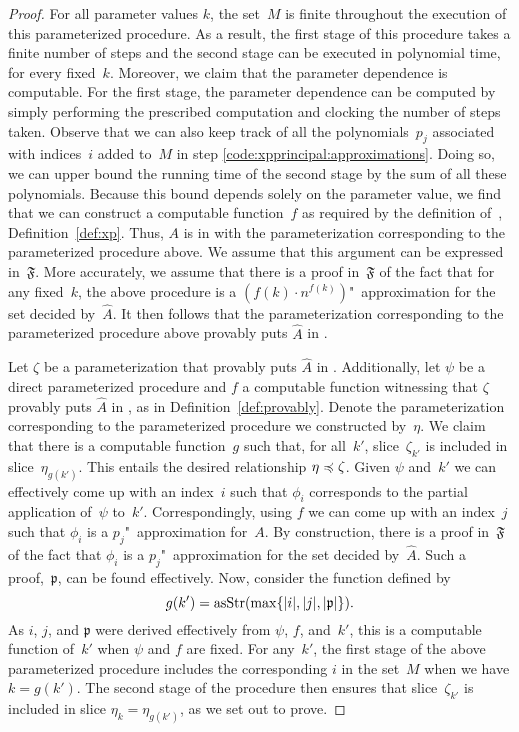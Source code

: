 \begin{proof}
  For all parameter values $k$, the set~$M$ is finite throughout the execution of this parameterized procedure.
  As a result, the first stage of this procedure takes a finite number of steps and the second stage can be executed in polynomial time, for every fixed~$k$.
  Moreover, we claim that the parameter dependence is computable.
  For the first stage, the parameter dependence can be computed by simply performing the prescribed computation and clocking the number of steps taken.
  Observe that we can also keep track of all the polynomials~$p_j$ associated with indices~$i$ added to~$M$ in step \ref{code:xpprincipal:approximations}.
  Doing so, we can upper bound the running time of the second stage by the sum of all these polynomials.
  Because this bound depends solely on the parameter value, we find that we can construct a computable function~$f$ as required by the definition of~, Definition~\ref{def:xp}.
  Thus, $A$ is in  with the parameterization corresponding to the parameterized procedure above.
  We assume that this argument can be expressed in~$\mathfrak{F}$.
  More accurately, we assume that there is a proof in~$\mathfrak{F}$ of the fact that for any fixed~$k$, the above procedure is a $(f(k) \cdot n^{f(k)})$"~approximation for the set decided by~$\hat{A}$.
  It then follows that the parameterization corresponding to the parameterized procedure above provably puts $\hat{A}$ in .

  Let $\zeta$ be a parameterization that provably puts $\hat{A}$ in .
  Additionally, let $\psi$ be a direct parameterized procedure and $f$ a computable function witnessing that $\zeta$ provably puts $\hat{A}$ in , as in Definition~\ref{def:provably}.
  Denote the parameterization corresponding to the parameterized procedure we constructed by~$\eta$.
  We claim that there is a computable function~$g$ such that, for all~$k'$, slice~$\zeta_{k'}$ is included in slice~$\eta_{g(k')}$.
  This entails the desired relationship $\eta \preccurlyeq \zeta$.
  Given $\psi$ and~$k'$ we can effectively come up with an index~$i$ such that $\phi_i$ corresponds to the partial application of~$\psi$ to~$k'$.
  Correspondingly, using $f$ we can come up with an index~$j$ such that $\phi_i$ is a $p_j$"~approximation for~$A$.
  By construction, there is a proof in~$\mathfrak{F}$ of the fact that $\phi_i$ is a $p_j$"~approximation for the set decided by~$\hat{A}$.
  Such a proof,~$\mathfrak{p}$, can be found effectively.
  Now, consider the function defined by
  \begin{equation*}
    g(k') = \operatorname{asStr}(\max\{{\lvert i\rvert}, {\lvert j\rvert}, {\lvert\mathfrak{p}\rvert}\}).
  \end{equation*}
  As $i$, $j$, and $\mathfrak{p}$ were derived effectively from $\psi$, $f$, and~$k'$, this is a computable function of~$k'$ when $\psi$ and $f$ are fixed.
  For any~$k'$, the first stage of the above parameterized procedure includes the corresponding $i$ in the set~$M$ when we have $k = g(k')$.
  The second stage of the procedure then ensures that slice~$\zeta_{k'}$ is included in slice $\eta_k = \eta_{g(k')}$, as we set out to prove.
\end{proof}

